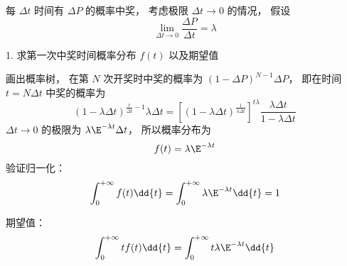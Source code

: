 
每 $\Delta t$ 时间有 $\Delta P$ 的概率中奖， 考虑极限 $\Delta t\to 0$ 的情况， 假设
\begin{equation}
\lim_{\Delta t\to 0}\frac{\Delta P}{\Delta t} = \lambda
\end{equation}


1. 求第一次中奖时间概率分布 $f(t)$ 以及期望值

画出概率树， 在第 $N$ 次开奖时中奖的概率为 $(1-\Delta P)^{N-1} \Delta P$， 即在时间 $t = N\Delta t$ 中奖的概率为
\begin{equation}
(1-\lambda\Delta t)^{\frac{t}{\Delta t}-1} \lambda\Delta t
= [(1-\lambda\Delta t)^{\frac{1}{\lambda\Delta t}}]^{t\lambda} \frac{\lambda\Delta t}{1-\lambda\Delta t}
\end{equation}
$\Delta t\to 0$ 的极限为 $\lambda\E^{-\lambda t}\Delta t$， 所以概率分布为
\begin{equation}
f(t) = \lambda\E^{-\lambda t}
\end{equation}
验证归一化：
\begin{equation}
\int_0^{+\infty} f(t) \dd{t} = \int_0^{+\infty} \lambda\E^{-\lambda t} \dd{t} = 1
\end{equation}

期望值：
\begin{equation}
\int_0^{+\infty} t f(t) \dd{t} = \int_0^{+\infty}t \lambda\E^{-\lambda t} \dd{t}
\end{equation}
